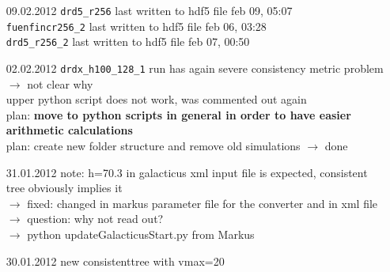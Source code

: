 \begin{itemize}
\item[09.02.2012]
\texttt{drd5\_r256} last written to hdf5 file feb 09, 05:07 \\
\texttt{fuenfincr256\_2} last written to hdf5 file feb 06, 03:28 \\
\texttt{drd5\_r256\_2} last written to hdf5 file feb 07, 00:50 \\

\item[02.02.2012]
\texttt{drdx\_h100\_128\_1} run has again severe consistency 
metric problem \\ $\rightarrow$ not clear why \\
upper python script does not work, was commented out again \\
plan: \textbf{move to python scripts in general in order to have
 easier arithmetic calculations} \\   
plan: create new folder structure and remove old simulations $\rightarrow$ done \\

\item[31.01.2012]
note: h=70.3 in galacticus xml input file is expected, consistent tree obviously implies it \\
$\rightarrow$ fixed: changed in markus parameter file for the converter and in xml file \\
$\rightarrow$ question: why not read out? \\
$\rightarrow$ python updateGalacticusStart.py from Markus 

\item[30.01.2012]
new consistenttree with vmax=20

\end{itemize}